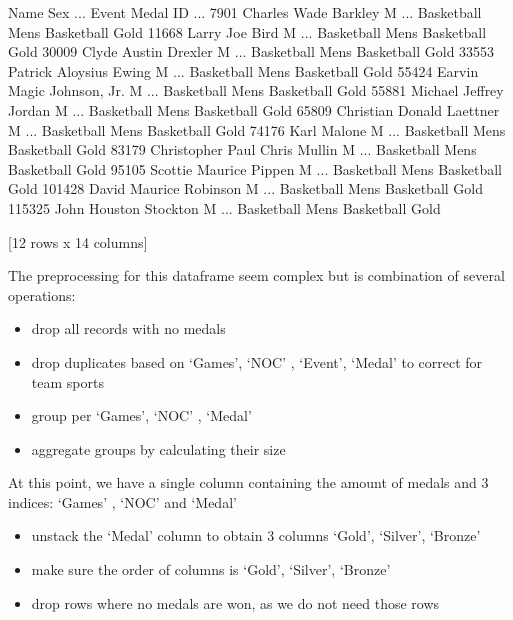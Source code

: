 \documentclass[letterpaper,10pt,english]{jupyterBook}
\begin{document}
\begin{sphinxVerbatim}[commandchars=\\\{\}]
                                   Name Sex  ...                        Event  Medal
ID                                           ...                                    
7901               Charles Wade Barkley   M  ...  Basketball Men\PYGZsq{}s Basketball   Gold
11668                    Larry Joe Bird   M  ...  Basketball Men\PYGZsq{}s Basketball   Gold
30009              Clyde Austin Drexler   M  ...  Basketball Men\PYGZsq{}s Basketball   Gold
33553            Patrick Aloysius Ewing   M  ...  Basketball Men\PYGZsq{}s Basketball   Gold
55424       Earvin \PYGZdq{}Magic\PYGZdq{} Johnson, Jr.   M  ...  Basketball Men\PYGZsq{}s Basketball   Gold
55881            Michael Jeffrey Jordan   M  ...  Basketball Men\PYGZsq{}s Basketball   Gold
65809         Christian Donald Laettner   M  ...  Basketball Men\PYGZsq{}s Basketball   Gold
74176                       Karl Malone   M  ...  Basketball Men\PYGZsq{}s Basketball   Gold
83179   Christopher Paul \PYGZdq{}Chris\PYGZdq{} Mullin   M  ...  Basketball Men\PYGZsq{}s Basketball   Gold
95105            Scottie Maurice Pippen   M  ...  Basketball Men\PYGZsq{}s Basketball   Gold
101428           David Maurice Robinson   M  ...  Basketball Men\PYGZsq{}s Basketball   Gold
115325            John Houston Stockton   M  ...  Basketball Men\PYGZsq{}s Basketball   Gold

[12 rows x 14 columns]
\end{sphinxVerbatim}

\sphinxAtStartPar
The preprocessing for this dataframe seem complex but is combination of several operations:
\begin{itemize}
\item {} 
\sphinxAtStartPar
drop all records with no medals

\item {} 
\sphinxAtStartPar
drop duplicates based on ‘Games’, ‘NOC’ , ‘Event’, ‘Medal’ to correct for team sports

\item {} 
\sphinxAtStartPar
group per ‘Games’, ‘NOC’ , ‘Medal’

\item {} 
\sphinxAtStartPar
aggregate groups by calculating their size

\end{itemize}

\sphinxAtStartPar
At this point, we have a single column containing the amount of medals and 3 indices: ‘Games’ , ‘NOC’ and ‘Medal’
\begin{itemize}
\item {} 
\sphinxAtStartPar
unstack the ‘Medal’ column to obtain 3 columns ‘Gold’, ‘Silver’, ‘Bronze’

\item {} 
\sphinxAtStartPar
make sure the order of columns is ‘Gold’, ‘Silver’, ‘Bronze’

\item {} 
\sphinxAtStartPar
drop rows where no medals are won, as we do not need those rows

\end{itemize}
\end{document}
